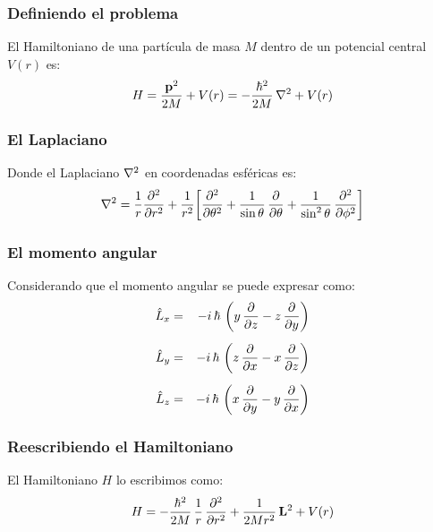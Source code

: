 \documentclass[12pt]{beamer}
\begin{document}
\begin{frame}
\frametitle{Definiendo el problema}
El Hamiltoniano de una partícula de masa $M$ dentro de un potencial central $V (r)$ es:
\pause
\begin{align}
H = \dfrac{\vb{p}^{2}}{2 M} + V (r) = - \dfrac{\hbar^{2}}{2 M} \, \laplacian + V (r)
\label{eq:ecuacion_08_01}
\end{align}
\end{frame}
\begin{frame}
\frametitle{El Laplaciano}
Donde el Laplaciano $\laplacian$ en coordenadas esféricas es:
\pause
\begin{align}
\laplacian = \dfrac{1}{r} \pdv[2]{r} + \dfrac{1}{r^{2}} \bigg[ \pdv[2]{\theta} + \dfrac{1}{\sin \theta} \, \pdv{\theta} + \dfrac{1}{\sin^{2} \theta} \, \pdv[2]{\phi} \bigg]
\label{eq:ecuacion_08_02}
\end{align}
\end{frame}
\begin{frame}
\frametitle{El momento angular}
Considerando que el momento angular se puede expresar como:
\pause
\begin{align}
\begin{aligned}
\hat{L}_{x} &=& - i \, \hbar \, \left( y \, \pdv{z} - z \, \pdv{y} \right) \\[0.5em] 
\hat{L}_{y} &=& - i \, \hbar \, \left( z \, \pdv{x} - x \, \pdv{z} \right) \\[0.5em] 
\hat{L}_{z} &=& - i \, \hbar \, \left( x \, \pdv{y} - y \, \pdv{x} \right)
\end{aligned}
\label{eq:ecuacion_01_03a}
\end{align}
\end{frame}
\begin{frame}
\frametitle{Reescribiendo el Hamiltoniano}
El Hamiltoniano $H$ lo escribimos como:
\pause
\begin{align}
H = - \dfrac{\hbar^{2}}{2 M} \, \dfrac{1}{r} \, \pdv[2]{r} + \dfrac{1}{2 M r^{2}} \, \vb{L}^{2} + V (r)
\label{eq:ecuacion_08_03}
\end{align}
\end{frame}
\end{document}

